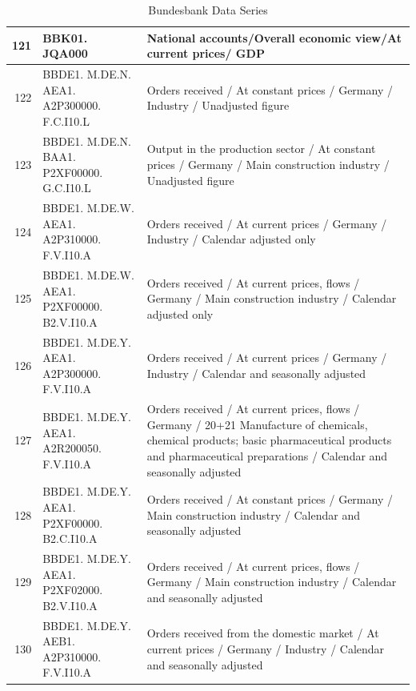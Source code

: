 \documentclass[12pt]{article}
\begin{document}
\begin{table}[ht]
\caption{Bundesbank Data Series}
\label{bb data}
\centering
\begin{tabular}{r|p{4cm}p{11cm}}
	\hline
	121 & BBK01. JQA000 & National accounts/Overall economic view/At current prices/ GDP \\ 
	\hline
	122 & BBDE1. M.DE.N. AEA1. A2P300000. F.C.I10.L & Orders received / At constant prices / Germany / Industry /
	 Unadjusted figure \\ 
	 \hline
	123 & BBDE1. M.DE.N. BAA1. P2XF00000. G.C.I10.L & Output in the production sector / At constant prices / Germany / Main construction industry / Unadjusted figure \\ 
	\hline
	124 & BBDE1. M.DE.W. AEA1. A2P310000. F.V.I10.A & Orders received / At current prices / Germany / Industry / Calendar adjusted only \\ 
	\hline
	125 & BBDE1. M.DE.W. AEA1. P2XF00000. B2.V.I10.A & Orders received / At current prices, flows / Germany / Main construction industry / Calendar adjusted only \\ 
	\hline
	126 & BBDE1. M.DE.Y. AEA1. A2P300000. F.V.I10.A & Orders received / At current prices / Germany / Industry / Calendar and seasonally adjusted \\ 
	\hline
	127 & BBDE1. M.DE.Y. AEA1. A2R200050. F.V.I10.A & Orders received / At current prices, flows / Germany / 20+21 Manufacture of chemicals, chemical products; basic pharmaceutical products and pharmaceutical preparations / Calendar and seasonally adjusted \\ 
	\hline
	128 & BBDE1. M.DE.Y. AEA1. P2XF00000. B2.C.I10.A & Orders received / At constant prices / Germany / Main construction industry / Calendar and seasonally adjusted \\ 
	\hline
	129 & BBDE1. M.DE.Y. AEA1. P2XF02000. B2.V.I10.A & Orders received / At current prices, flows / Germany / Main construction industry / Calendar and seasonally adjusted \\ 
	\hline
	130 & BBDE1. M.DE.Y. AEB1. A2P310000. F.V.I10.A & Orders received from the domestic market / At current prices / Germany / Industry / Calendar and seasonally adjusted \\ 
	\hline
\end{tabular}
\end{table}
\end{document}

